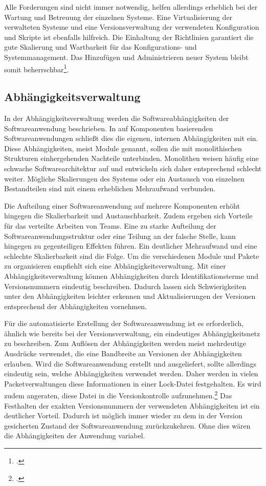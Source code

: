 Alle Forderungen sind nicht immer notwendig, helfen allerdings erheblich bei der Wartung und Betreuung der einzelnen Systeme. 
Eine Virtualisierung der verwalteten Systeme und eine Versionsverwaltung der verwendeten Konfiguration und Skripte ist ebenfalls
hilfreich. Die Einhaltung der Richtlinien garantiert die gute Skalierung und Wartbarkeit für das Konfigurations- und Systemmanagement. Das Hinzufügen und Administrieren neuer System bleibt somit beherrschbar\footcite[vgl.][]{humble2010}.

\subsection{Abhängigkeitsverwaltung}
\label{subsec:dependency-management}

In der Abhängigkeitsverwaltung werden die Softwareabhängigkeiten der Softwareanwendung beschrieben. In auf Komponenten
basierenden Softwareanwendungen schließt dies die eigenen, internen Abhängigkeiten mit ein. Diese Abhängigkeiten, meist Module
genannt, sollen die mit monolithischen Strukturen einhergehenden Nachteile unterbinden. Monolithen weisen häufig eine 
schwache Softwarearchitektur auf und entwickeln sich daher entsprechend schlecht weiter. Mögliche Skalierungen des 
Systems oder ein Austausch von einzelnen Bestandteilen sind mit einem erheblichen Mehraufwand verbunden.

Die Aufteilung einer Softwareanwendung auf mehrere Komponenten erhöht hingegen die Skalierbarkeit und Austauschbarkeit. Zudem
ergeben sich Vorteile für das verteilte Arbeiten von Teams. 
Eine zu starke Aufteilung der Softwareanwendungsstruktur oder eine Teilung an der falsche Stelle, kann hingegen zu gegenteiligen
Effekten führen. Ein deutlicher Mehraufwand und eine schlechte Skalierbarkeit sind die Folge. Um die verschiedenen Module 
und Pakete zu organisieren empfiehlt sich eine Abhängigkeitsverwaltung. Mit einer Abhängigkeitsverwaltung können Abhängigkeiten durch Identifikationsterme und Versionsnummern eindeutig beschreiben. Dadurch lassen sich Schwierigkeiten unter den Abhängigkeiten leichter erkennen und Aktualisierungen der Versionen entsprechend der Abhängigkeiten vornehmen.

Für die automatisierte Erstellung der Softwareanwendung ist es erforderlich, ähnlich wie bereits bei der 
Versionsverwaltung, ein eindeutiges Abhängigkeitsnetz zu beschreiben. Zum Auflösen der Abhängigkeiten werden meist 
mehrdeutige Ausdrücke verwendet, die eine Bandbreite an Versionen der Abhängigkeiten erlauben. Wird die Softwareanwendung
erstellt und ausgeliefert, sollte allerdings eindeutig sein, welche Abhängigkeiten verwendet werden. Daher werden in 
vielen Packetverwaltungen diese Informationen in einer Lock-Datei festgehalten. Es wird zudem angeraten, diese Datei in 
die Versionkontrolle aufzunehmen.\footcite[vgl.][]{composer-why-lock-in-vcs} Das Festhalten der exakten Versionsnummern der verwendeten Abhängigkeiten ist ein deutlicher Vorteil. Dadurch ist möglich immer wieder zu dem in der Version gesicherten Zustand der Softwareanwendung zurückzukehren. Ohne dies wären die Abhängigkeiten der Anwendung variabel.

